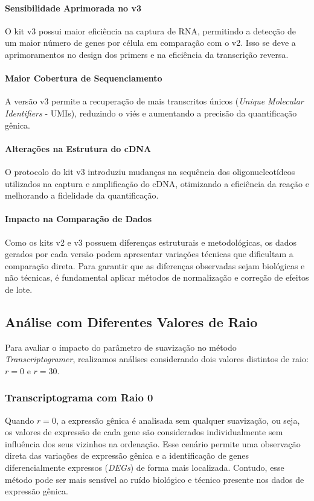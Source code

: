 \documentclass[12pt]{article}
\begin{document}
\paragraph{Sensibilidade Aprimorada no v3}  
O kit v3 possui maior eficiência na captura de RNA, permitindo a detecção de um maior número de genes por célula em comparação com o v2. Isso se deve a aprimoramentos no design dos primers e na eficiência da transcrição reversa.

\paragraph{Maior Cobertura de Sequenciamento}  
A versão v3 permite a recuperação de mais transcritos únicos (\textit{Unique Molecular Identifiers} - UMIs), reduzindo o viés e aumentando a precisão da quantificação gênica.

\paragraph{Alterações na Estrutura do cDNA}  
O protocolo do kit v3 introduziu mudanças na sequência dos oligonucleotídeos utilizados na captura e amplificação do cDNA, otimizando a eficiência da reação e melhorando a fidelidade da quantificação.

\paragraph{Impacto na Comparação de Dados}  
Como os kits v2 e v3 possuem diferenças estruturais e metodológicas, os dados gerados por cada versão podem apresentar variações técnicas que dificultam a comparação direta. Para garantir que as diferenças observadas sejam biológicas e não técnicas, é fundamental aplicar métodos de normalização e correção de efeitos de lote.


\subsection{Análise com Diferentes Valores de Raio}

Para avaliar o impacto do parâmetro de suavização no método \textit{Transcriptogramer}, realizamos análises considerando dois valores distintos de raio: $r = 0$ e $r = 30$. 

\subsubsection{Transcriptograma com Raio 0}
Quando $r = 0$, a expressão gênica é analisada sem qualquer suavização, ou seja, os valores de expressão de cada gene são considerados individualmente sem influência dos seus vizinhos na ordenação. Esse cenário permite uma observação direta das variações de expressão gênica e a identificação de genes diferencialmente expressos (\textit{DEGs}) de forma mais localizada. Contudo, esse método pode ser mais sensível ao ruído biológico e técnico presente nos dados de expressão gênica.
\end{document}
